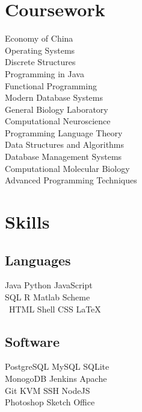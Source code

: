 \documentclass[]{deedy-resume}
\begin{document}
\begin{minipage}[t]{0.33\textwidth}

\section{Coursework}
Economy of China\\
Operating Systems\\
Discrete Structures\\
Programming in Java\\
Functional Programming\\
Modern Database Systems\\
General Biology Laboratory\\
Computational Neuroscience\\
Programming Language Theory\\
Data Structures and Algorithms\\
Database Management Systems\\
Computational Molecular Biology\\
Advanced Programming Techniques
\sectionsep


\section{Skills}
\subsection{Languages}
Java \textbullet{}  
Python \textbullet{}
JavaScript \\
SQL \textbullet{}
R \textbullet{}
Matlab \textbullet{}
Scheme \\\
HTML \textbullet{}
Shell \textbullet{} 
CSS \textbullet{}
\LaTeX\ \\ 

\subsection{Software}
PostgreSQL \textbullet{}
MySQL \textbullet{} 
SQLite \\
MonogoDB \textbullet{}
Jenkins \textbullet{}
Apache \\
Git \textbullet{}
KVM \textbullet{}
SSH \textbullet{}
NodeJS \\
Photoshop \textbullet{}
Sketch \textbullet{}
Office \\


\end{minipage}
\end{document}
